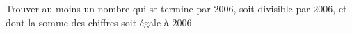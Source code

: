 Trouver au moins un nombre qui se termine par $2006$, soit divisible par $2006$, et dont la somme des chiffres soit égale à $2006$.
